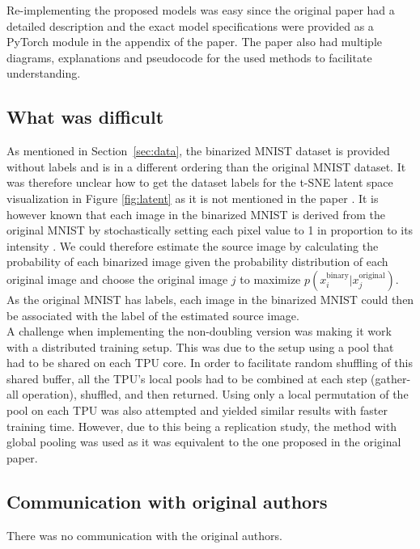Re-implementing the proposed models was easy since the original paper had a detailed description and the exact model specifications were provided as a PyTorch module in the appendix of the paper. The paper also had multiple diagrams, explanations and pseudocode for the used methods to facilitate understanding. %

\subsection{What was difficult}


As mentioned in Section~\ref{sec:data}, the binarized MNIST dataset is provided without labels and is in a different ordering than the original MNIST dataset. It was therefore unclear how to get the dataset labels for the t-SNE latent space visualization in Figure \ref{fig:latent} as it is not mentioned in the paper \cite{palm2022variational}. It is however known that each image in the binarized MNIST is derived from the original MNIST by stochastically setting each pixel value to 1 in proportion to its intensity \cite{binarizedMNIST}. We could therefore estimate the source image by calculating the probability of each binarized image given the probability distribution of each original image and choose the original image $j$ to maximize $p(x^{\text{binary}}_i|x^{\text{original}}_j)$. As the original MNIST has labels, each image in the binarized MNIST could then be associated with the label of the estimated source image.\\

A challenge when implementing the non-doubling version was making it work with a distributed training setup. This was due to the setup using a pool that had to be shared on each TPU core. In order to facilitate random shuffling of this shared buffer, all the TPU's local pools had to be combined at each step (gather-all operation), shuffled, and then returned. Using only a local permutation of the pool on each TPU was also attempted and yielded similar results with faster training time. However, due to this being a replication study, the method with global pooling was used as it was equivalent to the one proposed in the original paper.


\subsection{Communication with original authors}
There was no communication with the original authors.
